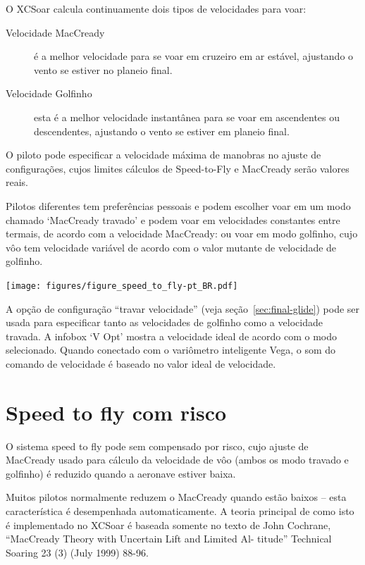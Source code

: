 O XCSoar calcula continuamente dois tipos de velocidades para voar:
\begin{description}
\item[Velocidade MacCready]  é a melhor velocidade para se voar em cruzeiro em ar estável, ajustando o vento se estiver no planeio final.
\item[Velocidade Golfinho]  esta é a melhor velocidade instantânea para se voar em ascendentes ou descendentes, ajustando o vento se estiver em planeio final.
\end{description}  

O piloto pode especificar a velocidade máxima de manobras no ajuste de configurações, cujos limites cálculos de Speed-to-Fly e MacCready serão valores reais.

Pilotos diferentes tem preferências pessoais e podem escolher voar em um modo chamado ‘MacCready travado’ e podem voar em velocidades constantes entre termais, de acordo com a velocidade MacCready: ou voar em modo golfinho, cujo vôo tem velocidade variável de acordo com o valor mutante de velocidade de golfinho. 

\begin{maxipage}
\begin{center}
\texttt{[image: figures/figure\_speed\_to\_fly-pt\_BR.pdf]}
\end{center}
\end{maxipage}

A opção de configuração “travar velocidade” (veja seção~\ref{sec:final-glide}) pode ser usada para especificar tanto as velocidades de golfinho como a velocidade travada.  A infobox ‘V Opt’ mostra a velocidade ideal de acordo com o modo selecionado. Quando conectado com o variômetro inteligente Vega, o som do comando de velocidade é baseado no valor ideal de velocidade.


\section{Speed to fly com risco}\label{sec:safety-factor}

 O sistema speed to fly pode sem compensado por risco, cujo ajuste de MacCready usado para cálculo da velocidade de vôo (ambos os modo travado e golfinho) é reduzido quando a aeronave estiver baixa.

Muitos pilotos normalmente reduzem o MacCready quando estão baixos – esta característica é desempenhada automaticamente.  A teoria principal de como isto é implementado no XCSoar é baseada somente no texto de John Cochrane, “MacCready Theory with Uncertain Lift and Limited Al- titude” Technical Soaring 23 (3) (July 1999) 88-96.

